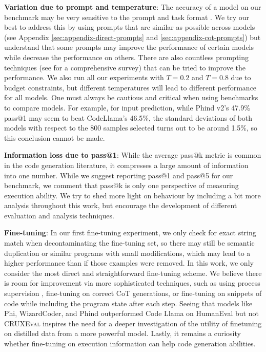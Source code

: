 \documentclass{article}
\newcommand{\benchmark}{\textsc{CRUXEval}\xspace}
\begin{document}
\textbf{Variation due to prompt and temperature}: The accuracy of a model on our benchmark may be very sensitive to the prompt and task format \citep{mizrahi2023state}. We try our best to address this by using prompts that are similar as possible across models (see Appendix \ref{sec:appendix-direct-prompts} and \ref{sec:appendix-cot-prompts}) but understand that some prompts may improve the performance of certain models while decrease the performance on others. There are also countless prompting techniques (see \citep{liu2023pre} for a comprehensive survey) that can be tried to improve the performance. We also run all our experiments with $T=0.2$ and $T=0.8$ due to budget constraints, but different temperatures will lead to different performance for all models. One must always be cautious and critical when using benchmarks to compare models. For example, for input prediction, while Phind v2's 47.9\% pass@1 may seem to beat CodeLlama's 46.5\%, the standard deviations of both models with respect to the $800$ samples selected turns out to be around 1.5\%, so this conclusion cannot be made.

\textbf{Information loss due to pass@1}: While the average pass@k metric is common in the code generation literature, it compresses a large amount of information into one number. While we suggest reporting pass@1 and pass@5 for our benchmark, we comment that pass@k is only one perspective of measuring execution ability. We try to shed more light on behaviour by including a bit more analysis throughout this work, but encourage the development of different evaluation and analysis techniques.

\textbf{Fine-tuning}: In our first fine-tuning experiment, we only check for exact string match when decontaminating the fine-tuning set, so there may still be semantic duplication or similar programs with small modifications, which may lead to a higher performance than if those examples were removed. In this work, we only consider the most direct and straightforward fine-tuning scheme. We believe there is room for improvement via more sophisticated techniques, such as using process supervision \citep{uesato2022solving}, fine-tuning on correct CoT generations, or fine-tuning on snippets of code while including the program state after each step. Seeing that models like Phi, WizardCoder, and Phind outperformed Code Llama on HumanEval but not \benchmark inspires the need for a deeper investigation of the utility of finetuning on distilled data from a more powerful model. Lastly, it remains a curiosity whether fine-tuning on execution information can help code generation abilities.
\end{document}
